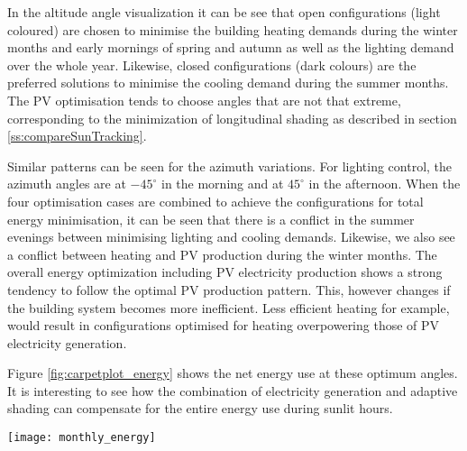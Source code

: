 In the altitude angle visualization it can be see that open configurations (light coloured) are chosen to minimise the building heating demands during the winter months and early mornings of spring and autumn as well as the lighting demand over the whole year. Likewise, closed configurations (dark colours) are the preferred solutions to minimise the cooling demand during the summer months. The PV optimisation tends to choose angles that are not that extreme, corresponding to the minimization of longitudinal shading as described in section \ref{ss:compareSunTracking}. 

Similar patterns can be seen for the azimuth variations. For lighting control, the azimuth angles are at $-45^{\circ}$ in the morning and at $45^{\circ}$ in the afternoon. When the four optimisation cases are combined to achieve the configurations for total energy minimisation, it can be seen that there is a conflict in the summer evenings between minimising lighting and cooling demands. Likewise, we also see a conflict between heating and PV production during the winter months. The overall energy optimization including PV electricity production shows a strong tendency to follow the optimal PV production pattern. This, however changes if the building system becomes more inefficient. Less efficient heating for example, would result in configurations optimised for heating overpowering those of PV electricity generation.







	Figure \ref{fig:carpetplot_energy} shows the net energy use at these optimum angles. It is interesting to see how the combination of electricity generation and adaptive shading can compensate for the entire energy use during sunlit hours.

\begin{figure*}
	\begin{center}
	\texttt{[image: monthly\_energy]}
	\caption{Carpet plots detailing the net energy consumption. Each square represents the total energy consumption for that specific hour of the entire month. Red colours detail the energy demand, while blue colours detail the energy supply.}
	\label{fig:carpetplot_energy}
	\end{center}
\end{figure*}


